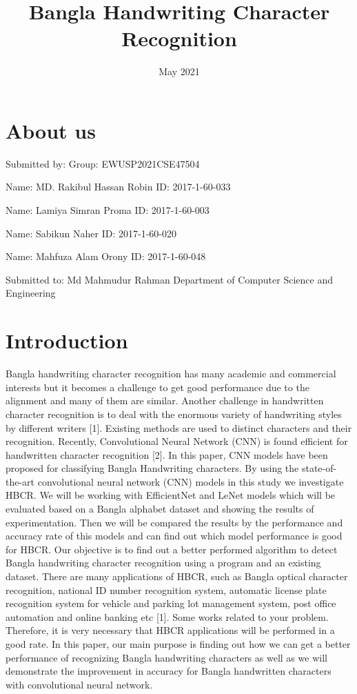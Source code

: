 \documentclass{article}
\title{Bangla Handwriting Character Recognition}
\date{May 2021}
\begin{document}
\maketitle
\section{About us}
Submitted by:
Group: EWUSP2021CSE47504

Name: MD. Rakibul Hassan Robin
ID: 2017-1-60-033

Name: Lamiya Simran Proma
ID: 2017-1-60-003

Name: Sabikun Naher
ID: 2017-1-60-020

Name: Mahfuza Alam Orony
ID: 2017-1-60-048


Submitted to:
Md Mahmudur Rahman
Department of Computer Science and Engineering

\section{Introduction}
Bangla handwriting character recognition has many academic and commercial interests but it becomes a challenge to get good performance due to the alignment and many of them are similar. Another challenge in handwritten character recognition is to deal with the enormous variety of handwriting styles by different writers [1]. Existing methods are used to distinct characters and their recognition. Recently, Convolutional Neural Network (CNN) is found efficient for handwritten character recognition [2]. 
In this paper, CNN models have been proposed for classifying Bangla Handwriting characters. By using the state-of-the-art convolutional neural network (CNN) models in this study we investigate HBCR. We will be working with EfficientNet and LeNet models which will be evaluated based on a Bangla alphabet dataset and showing the results of experimentation. Then we will be compared the results by the performance and accuracy rate of this models and can find out which model performance is good for HBCR. Our objective is to find out a better performed algorithm to detect Bangla handwriting character recognition using a program and an existing dataset.
There are many applications of HBCR, such as Bangla optical character recognition, national ID number recognition system, automatic license plate recognition system for vehicle and parking lot management system, post office automation and online banking etc [1]. Some works related to your problem. Therefore, it is very necessary that HBCR applications will be performed in a good rate. In this paper, our main purpose is finding out how we can get a better performance of recognizing Bangla handwriting characters as well as we will demonstrate the improvement in accuracy for Bangla handwritten characters with convolutional neural network.
	
\end{document}
